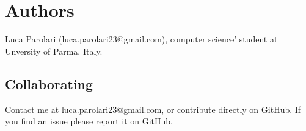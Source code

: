 \section{Authors}
Luca Parolari (luca.parolari23@gmail.com), computer science' student at Unversity of Parma, Italy.

\subsection{Collaborating}
Contact me at luca.parolari23@gmail.com, or contribute directly on GitHub.
If you find an issue please report it on GitHub.
